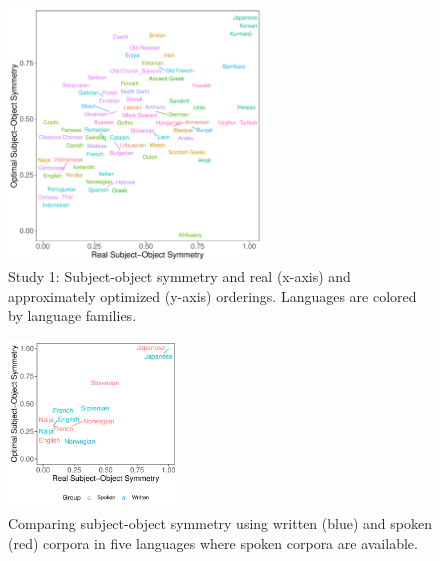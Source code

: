\documentclass[11pt,a4paper]{article}
\newcommand\comment[1]{{\color{red}#1}}
\begin{document}
\begin{figure}
    \centering
    \includegraphics[width=0.6\textwidth]{figures/fracion-optimized_DLM_2.6_format.pdf}
    \caption{Study 1: Subject-object symmetry and real (x-axis) and approximately optimized (y-axis) orderings. Languages are colored by language families.}
    \label{fig:study1}
\end{figure}

\begin{figure}
    \centering
    \includegraphics[width=0.4\textwidth]{analysis_spoken/spoken.pdf}
    \caption{Comparing subject-object symmetry using written (blue) and spoken (red) corpora in five languages where spoken corpora are available.}
    \label{fig:spoken}
\end{figure}



\end{document}
